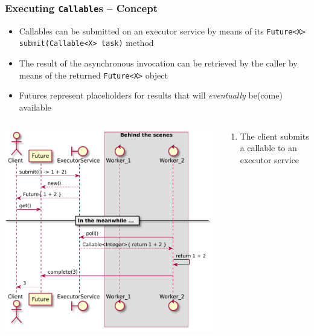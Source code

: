 \documentclass{beamer}\mode<presentation>{\usetheme{AMSCesenaPurpleAndGold}}
\begin{document}
\begin{frame}[allowframebreaks]
\frametitle{Executing \texttt{Callable}s -- Concept}

\begin{itemize}
\item Callables can be \alert{submitted} on an executor service by means of its \texttt{Future<X> submit(Callable<X> task)} method

\vspace{.5cm}

\item The result of the asynchronous invocation can be retrieved by the caller by means of the returned \texttt{Future<X>} object

\vspace{.5cm}

\item Futures represent \alert{placeholders} for results that will \emph{eventually} be(come) available
\end{itemize}
%
\framebreak
%
\begin{columns}
\begin{column}{.6\linewidth}
\begin{center}
\includegraphics[width=\linewidth]{img/submit.pdf}
\end{center}
\end{column}
\begin{column}{.4\linewidth}
\begin{enumerate}
\item The client \alert{submits} a callable to an executor service


\end{enumerate}
\end{column}
\end{columns}
\end{frame}
\end{document}
